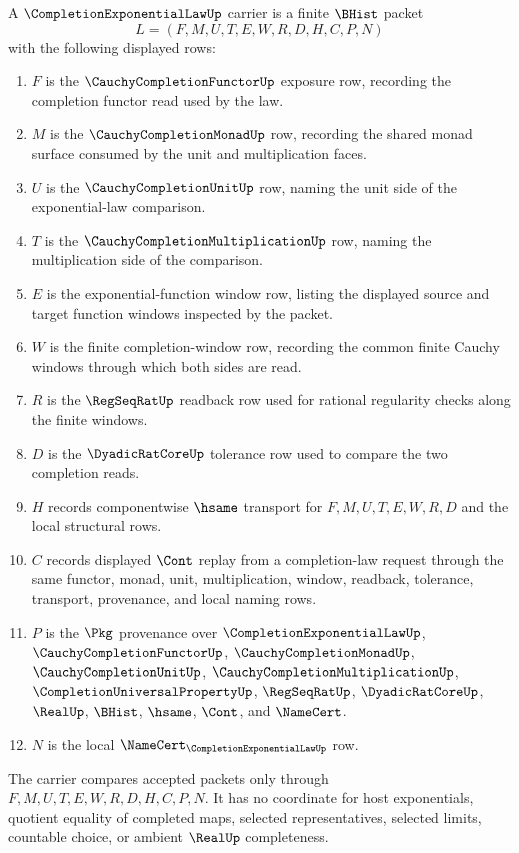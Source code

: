 \begin{definition}
\label{def:completion-exponential-law-carrier}
A $\CompletionExponentialLawUp$ carrier is a finite $\BHist$ packet
$$
L=(F,M,U,T,E,W,R,D,H,C,P,N)
$$
with the following displayed rows:
\begin{enumerate}
\item $F$ is the $\CauchyCompletionFunctorUp$ exposure row, recording the completion functor read used by the law.
\item $M$ is the $\CauchyCompletionMonadUp$ row, recording the shared monad surface consumed by the unit and multiplication faces.
\item $U$ is the $\CauchyCompletionUnitUp$ row, naming the unit side of the exponential-law comparison.
\item $T$ is the $\CauchyCompletionMultiplicationUp$ row, naming the multiplication side of the comparison.
\item $E$ is the exponential-function window row, listing the displayed source and target function windows inspected by the packet.
\item $W$ is the finite completion-window row, recording the common finite Cauchy windows through which both sides are read.
\item $R$ is the $\RegSeqRatUp$ readback row used for rational regularity checks along the finite windows.
\item $D$ is the $\DyadicRatCoreUp$ tolerance row used to compare the two completion reads.
\item $H$ records componentwise $\hsame$ transport for $F,M,U,T,E,W,R,D$ and the local structural rows.
\item $C$ records displayed $\Cont$ replay from a completion-law request through the same functor, monad, unit, multiplication, window, readback, tolerance, transport, provenance, and local naming rows.
\item $P$ is the $\Pkg$ provenance over $\CompletionExponentialLawUp$, $\CauchyCompletionFunctorUp$, $\CauchyCompletionMonadUp$, $\CauchyCompletionUnitUp$, $\CauchyCompletionMultiplicationUp$, $\CompletionUniversalPropertyUp$, $\RegSeqRatUp$, $\DyadicRatCoreUp$, $\RealUp$, $\BHist$, $\hsame$, $\Cont$, and $\NameCert$.
\item $N$ is the local $\NameCert_{\CompletionExponentialLawUp}$ row.
\end{enumerate}
The carrier compares accepted packets only through $F,M,U,T,E,W,R,D,H,C,P,N$. It has no coordinate for host exponentials, quotient equality of completed maps, selected representatives, selected limits, countable choice, or ambient $\RealUp$ completeness.
\end{definition}

